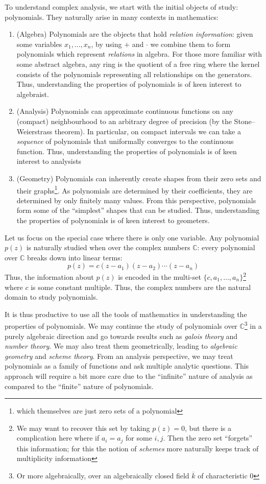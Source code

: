 \documentclass[oneside]{article}
\newcommand{\C}{\mathbb{C}}
\newcommand{\oln}{\overline}
\begin{document}
To understand complex analysis, we start with the initial objects of study: polynomials. They naturally arise
in many contexts in mathematics:
\begin{enumerate}
  \item (Algebra) Polynomials are the objects that hold \emph{relation information}: given some variables $x_1, ..., x_n$,
    by using $+$ and $\cdot$  we combine them to form polynomials which represent \emph{relations} in algebra. For those more
    familiar with some abstract algebra, any ring is the quotient of a free ring where the kernel consists of
    the polynomials representing all relationships on the generators. Thus, understanding the properties of
    polynomials is of keen interest to algebraist.
  \item (Analysis) Polynomials can approximate continuous functions on any (compact) neighbourhood to an
    arbitrary degree of precision (by the Stone–Weierstrass theorem). In particular, on compact intervals we can take
    a \emph{sequence} of polynomials that uniformally converges to the continuous function. Thus,
    understanding the properties of polynomials is of keen interest to analysists
   \item (Geometry) Polynomials can inherently create shapes from their zero sets and their
     graphs\footnote{which themselves are just zero sets of a polynomial}. As
     polynomials are determined by their coefficients, they are determined by only finitely many values.
     From this perspective, polynomials form some of the ``simplest'' shapes that can be studied. Thus,
     understanding the properties of polynomials is of keen interest to geometers.
 \end{enumerate}


Let us focus on the special case where there is only one variable. Any polynomial $p(z)$ is naturally studied
when over the complex numbers $\C$: every polynomial over $\C$ breaks down
into linear terms:
\[
  p(z) = c(z-a_1)(z-a_2)\cdots (z-a_n)
\]
Thus, the information about $p(z)$ is encoded in the multi-set $\{c, a_1, ..., a_n\}$\footnote{We may want to
  recover this set by taking $p(z) = 0$, but there is a complication here where if $a_i = a_j$ for some $i,j$.
  Then the zero set ``forgets'' this information; for this the notion of \emph{schemes} more naturally keeps
track of multiplicity information} where $c$ is some constant multiple. Thus, the complex numbers are the
natural domain to study polynomials.

It is thus productive to use all the tools of mathematics in understanding the properties of polynomials. We
may continue the study of polynomials over $\C$\footnote{Or more algebraically, over an algebraically closed
field $\oln{k}$ of characteristic $0$} in a purely algebraic direction and go towards results such as
\emph{galois theory} and \emph{number theory}. We may also treat them geometrically, leading to \emph{algebraic
geometry} and \emph{scheme theory}. From an analysis perspective, we may treat polynomials as a family of
functions and ask multiple analytic questions. This approach will require a bit more care due to the
``infinite'' nature of analysis as compared to the ``finite'' nature of polynomials.
\end{document}
